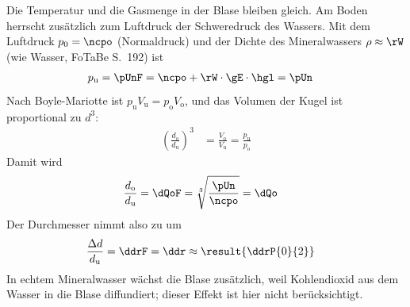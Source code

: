 \begin{center}
\end{center}

Die Temperatur und die Gasmenge in der Blase bleiben gleich. Am Boden herrscht zusätzlich zum Luftdruck der Schweredruck des Wassers. Mit dem Luftdruck $p_0 = \ncpo$ (Normaldruck) und der Dichte des Mineralwassers $\rho \approx \rW$ (wie Wasser, FoTaBe S.~192) ist
\begin{align}
 p_\text{u} &= \pUnF = \ncpo + \rW\cdot\gE\cdot\hgl = \pUn
\end{align}
Nach Boyle-Mariotte ist $p_\text{u}V_\text{u} = p_\text{o}V_\text{o}$, und das Volumen der Kugel ist proportional zu $d^3$:
\begin{align}
 \left(\frac{d_\text{o}}{d_\text{u}}\right)^3 &= \frac{V_\text{o}}{V_\text{u}} = \frac{p_\text{u}}{p_\text{o}}
\end{align}
Damit wird
\begin{align}
 \frac{d_\text{o}}{d_\text{u}} &= \dQoF = \sqrt[3]{\frac{\pUn}{\ncpo}} = \dQo
\end{align}
Der Durchmesser nimmt also zu um
\begin{align}
 \frac{\Delta d}{d_\text{u}} &= \ddrF = \ddr \approx \result{\ddrP{0}{2}}
\end{align}
In echtem Mineralwasser wächst die Blase zusätzlich, weil Kohlendioxid aus dem Wasser in die Blase diffundiert; dieser Effekt ist hier nicht berücksichtigt.
